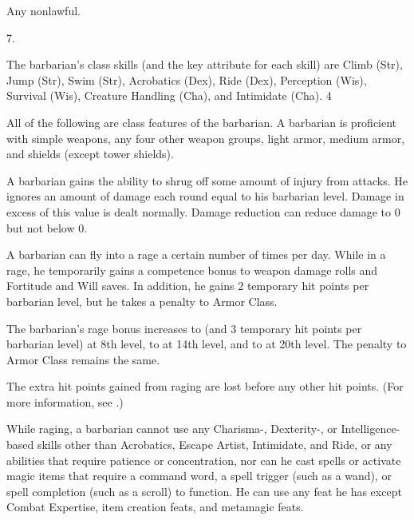  Any nonlawful.

 7.

The barbarian's class skills (and the key attribute for each skill) are
Climb (Str), Jump (Str), Swim (Str), Acrobatics (Dex), Ride (Dex), Perception (Wis), Survival (Wis), Creature Handling (Cha), and Intimidate (Cha).
 4


All of the following are class features of the barbarian.
  A barbarian is proficient with simple weapons, any four other weapon groups, light armor, medium armor, and shields (except tower shields).

 A barbarian gains the ability to shrug off some amount of injury from attacks. He ignores an amount of damage each round equal to his barbarian level. Damage in excess of this value is dealt normally. Damage reduction can reduce damage to 0 but not below 0.

\begin{comment}
\cf{Bbn}{Illiteracy} Barbarians are the only characters who do not
automatically know how to read and write. A barbarian may spend a skill point to gain the ability to read and write all languages he is able to speak.
A barbarian who gains a level in any other class automatically gains literacy. Any other
character who gains a barbarian level does not lose the literacy he or she already had.
\end{comment}

 A barbarian can fly into a rage a certain number of times per day. While in a rage, he temporarily gains a  competence bonus to weapon damage rolls and Fortitude and Will saves. In addition, he gains 2 temporary hit points per barbarian level, but he takes a  penalty to Armor Class.
\par The barbarian's rage bonus increases to  (and 3 temporary hit points per barbarian level) at 8th level, to  at 14th level, and to  at 20th level. The penalty to Armor Class remains the same.
\par The extra hit points gained from raging are lost before any other hit points. (For more information, see .)

While raging, a barbarian
cannot use any Charisma-, Dexterity-, or Intelligence-based
skills other than Acrobatics, Escape Artist, Intimidate, and
Ride, or any abilities that require
patience or concentration, nor can he cast spells or activate
magic items that require a command word, a spell trigger (such as a wand), or spell
completion (such as a scroll) to function. He can use any feat he has except Combat Expertise, item creation feats, and metamagic feats.

